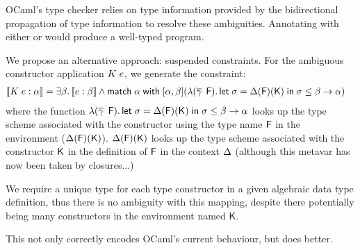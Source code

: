 \documentclass[acmsmall,screen,nonacm]{acmart}
\begin{document}
OCaml's type checker relies on type information provided by the
bidirectional  propagation of type
information to resolve these 
ambiguities. Annotating  with either  or  would
produce a well-typed program.

We propose an alternative approach: suspended constraints. For the ambiguous
constructor application $K \; e$, we generate the constraint:
\begin{align*}
\llbracket K \; e : \alpha\rrbracket &=
  \exists {\beta}.\, \llbracket e : \beta\rrbracket
  \wedge
  \mathopen{}\mathrel{\mathsf{match}} \alpha \mathrel{\mathsf{with}} [ \alpha, \beta ] (\lambda {(\overline{\gamma} \mathop{}\mathrel{\mathsf{F}})}.\,{\mathopen{}\mathrel{\mathsf{let}} \sigma = \Delta(\mathsf{F})(\mathsf{K}) \mathrel{\mathsf{in}} \sigma \leq \beta \to \alpha}
      )
\end{align*}
where the function $\lambda {(\overline{\gamma} \mathop{}\mathrel{\mathsf{F}})}.\,{\mathopen{}\mathrel{\mathsf{let}} \sigma = \Delta(\mathsf{F})(\mathsf{K}) \mathrel{\mathsf{in}} \sigma \leq \beta \to \alpha}$ looks up the type scheme
associated with the constructor using the type name $\mathsf{F}$ in the environment
($\Delta(\mathsf{F})(\mathsf{K})$). 
\Xalistair
{$\Delta(\mathsf{F})(\mathsf{K})$ looks up the type scheme associated with the constructor $\mathsf{K}$
in the definition of $\mathsf{F}$ in the context $\Delta$ (although this metavar has now
been taken by closures...)}


We require a unique type for each type constructor in a given algebraic data
type definition, thus there is no ambiguity with this mapping, despite there
potentially being many constructors in the environment named $\mathsf{K}$.

This not only correctly encodes OCaml's current behaviour, but does better.
\end{document}
